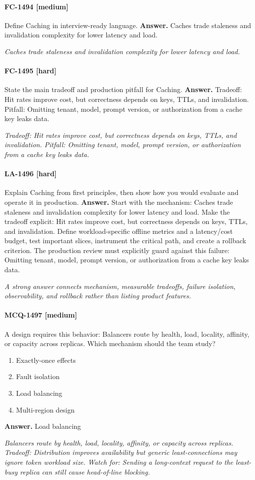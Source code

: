 \paragraph{FC-1494 [medium]} Define Caching in interview-ready language.
\noindent\textbf{Answer.} Caches trade staleness and invalidation complexity for lower latency and load.
\par\textit{Caches trade staleness and invalidation complexity for lower latency and load.}
\paragraph{FC-1495 [hard]} State the main tradeoff and production pitfall for Caching.
\noindent\textbf{Answer.} Tradeoff: Hit rates improve cost, but correctness depends on keys, TTLs, and invalidation. Pitfall: Omitting tenant, model, prompt version, or authorization from a cache key leaks data.
\par\textit{Tradeoff: Hit rates improve cost, but correctness depends on keys, TTLs, and invalidation. Pitfall: Omitting tenant, model, prompt version, or authorization from a cache key leaks data.}
\paragraph{LA-1496 [hard]} Explain Caching from first principles, then show how you would evaluate and operate it in production.
\noindent\textbf{Answer.} Start with the mechanism: Caches trade staleness and invalidation complexity for lower latency and load. Make the tradeoff explicit: Hit rates improve cost, but correctness depends on keys, TTLs, and invalidation. Define workload-specific offline metrics and a latency/cost budget, test important slices, instrument the critical path, and create a rollback criterion. The production review must explicitly guard against this failure: Omitting tenant, model, prompt version, or authorization from a cache key leaks data.
\par\textit{A strong answer connects mechanism, measurable tradeoffs, failure isolation, observability, and rollback rather than listing product features.}
\paragraph{MCQ-1497 [medium]} A design requires this behavior: Balancers route by health, load, locality, affinity, or capacity across replicas. Which mechanism should the team study?
\begin{enumerate}[label=\Alph*.]
\item Exactly-once effects
\item Fault isolation
\item Load balancing
\item Multi-region design
\end{enumerate}
\noindent\textbf{Answer.} Load balancing
\par\textit{Balancers route by health, load, locality, affinity, or capacity across replicas. Tradeoff: Distribution improves availability but generic least-connections may ignore token workload size. Watch for: Sending a long-context request to the least-busy replica can still cause head-of-line blocking.}
